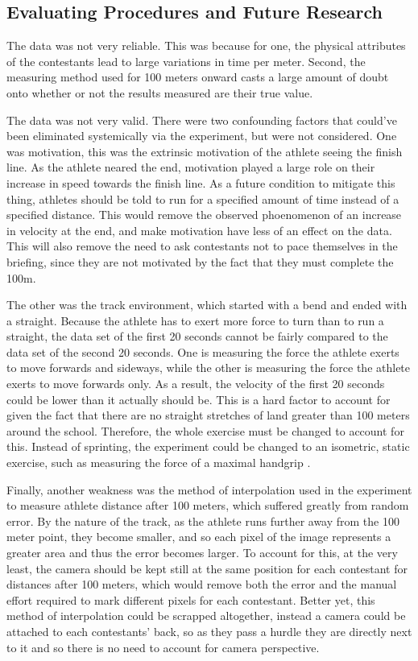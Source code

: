 \documentclass[index]{subfiles}
\begin{document}
\subsection{Evaluating Procedures and Future Research}

The data was not very reliable. This was because for one, the physical attributes of the contestants lead to large variations in time per meter. Second, the measuring method used for 100 meters onward casts a large amount of doubt onto whether or not the results measured are their true value. 

The data was not very valid. There were two confounding factors that could've been eliminated systemically via the experiment, but were not considered. One was motivation, this was the extrinsic motivation of the athlete seeing the finish line. As the athlete neared the end, motivation played a large role on their increase in speed towards the finish line. As a future condition to mitigate this thing, athletes should be told to run for a specified amount of time instead of a specified distance. This would remove the observed phoenomenon of an increase in velocity at the end, and make motivation have less of an effect on the data. This will also remove the need to ask contestants not to pace themselves in the briefing, since they are not motivated by the fact that they must complete the 100m.

The other was the track environment, which started with a bend and ended with a straight. Because the athlete has to exert more force to turn than to run a straight, the data set of the first 20 seconds cannot be fairly compared to the data set of the second 20 seconds. One is measuring the force the athlete exerts to move forwards and sideways, while the other is measuring the force the athlete exerts to move forwards only. As a result, the velocity of the first 20 seconds could be lower than it actually should be. This is a hard factor to account for given the fact that there are no straight stretches of land greater than 100 meters around the school. Therefore, the whole exercise must be changed to account for this. Instead of sprinting, the experiment could be changed to an isometric, static exercise, such as measuring the force of a maximal handgrip \parencite{kurosawaCreatineSupplementationEnhances2003}. 

Finally, another weakness was the method of interpolation used in the experiment to measure athlete distance after 100 meters, which suffered greatly from random error. By the nature of the track, as the athlete runs further away from the 100 meter point, they become smaller, and so each pixel of the image represents a greater area and thus the error becomes larger. To account for this, at the very least, the camera should be kept still at the same position for each contestant for distances after 100 meters, which would remove both the error and the manual effort required to mark different pixels for each contestant. Better yet, this method of interpolation could be scrapped altogether, instead a camera could be attached to each contestants' back, so as they pass a hurdle they are directly next to it and so there is no need to account for camera perspective.
\end{document}
